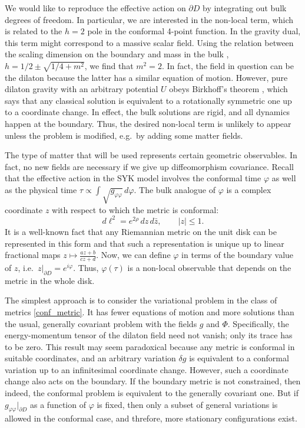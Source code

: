 \documentclass[12pt]{article}
\renewcommand{\le}{\leqslant}
\newcommand{\ph}{\varphi}
\def\eg{e.g.\ }
\def\ie{i.e.\ }
\begin{document}
We would like to reproduce the effective action on $\partial D$ by integrating out bulk degrees of freedom. In particular, we are interested in the non-local term, which is related to the $h=2$ pole in the conformal 4-point function. In the gravity dual, this term might correspond to a massive scalar field. Using the relation between the scaling dimension on the boundary and mass in the bulk \cite{GKP98,Wi98}, $h=1/2\pm\sqrt{1/4+m^2}$, we find that $m^2=2$. In fact, the field in question can be the dilaton because the latter has a similar equation of motion. However, pure dilaton gravity with an arbitrary potential $U$ obeys Birkhoff's theorem \cite{L-MKu94}, which says that any classical solution is equivalent to a rotationally symmetric one up to a coordinate change. In effect, the bulk solutions are rigid, and all dynamics happen at the boundary. Thus, the desired non-local term is unlikely to appear unless the problem is modified, \eg by adding some matter fields.

The type of matter that will be used represents certain geometric observables. In fact, no new fields are necessary if we give up diffeomorphism covariance. Recall that the effective action in the SYK model involves the conformal time $\ph$ as well as the physical time $\tau\propto\int\sqrt{g_{\ph\ph}}\,d\ph$. The bulk analogue of $\ph$ is a complex coordinate $z$ with respect to which the metric is conformal:
\begin{equation}\label{conf_metric}
d\ell^2=e^{2\rho}\,dz\,d\bar{z},\qquad |z|\le1.
\end{equation}
It is a well-known fact that any Riemannian metric on the unit disk can be represented in this form and that such a representation is unique up to linear fractional maps $z\mapsto\frac{az+b}{cz+d}$. Now, we can define $\ph$ in terms of the boundary value of $z$, \ie $z|_{\partial D}=e^{i\ph}$. Thus, $\ph(\tau)$ is a non-local observable that depends on the metric in the whole disk.

The simplest approach is to consider the variational problem in the class of metrics \eqref{conf_metric}. It has fewer equations of motion and more solutions than the usual, generally covariant problem with the fields $g$ and $\Phi$. Specifically, the energy-momentum tensor of the dilaton field need not vanish; only its trace has to be zero. This result may seem paradoxical because any metric is conformal in suitable coordinates, and an arbitrary variation $\delta g$ is equivalent to a conformal variation up to an infinitesimal coordinate change. However, such a coordinate change also acts on the boundary. If the boundary metric is not constrained, then indeed, the conformal problem is equivalent to the generally covariant one. But if $g_{\ph\ph}|_{\partial D}$ as a function of $\ph$ is fixed, then only a subset of general variations is allowed in the conformal case, and threfore, more stationary configurations exist.
\end{document}
